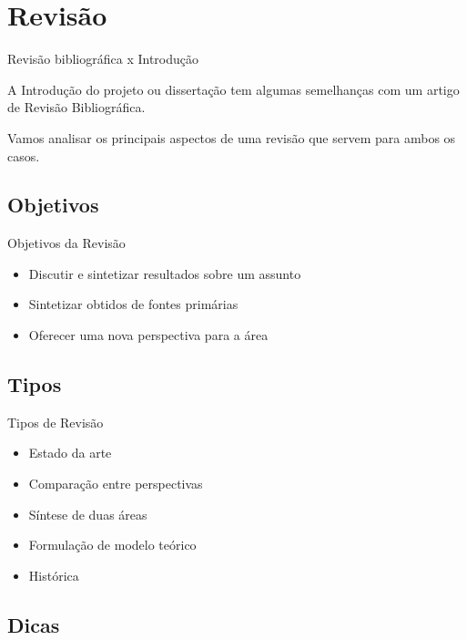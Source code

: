 \documentclass{beamer}
\begin{document}
\section{Revisão}

\begin{frame}{Revisão bibliográfica x Introdução}
  \begin{block}{}
    A Introdução do projeto ou dissertação tem algumas semelhanças com
    um artigo de Revisão Bibliográfica.

    \bigskip

    Vamos analisar os principais aspectos de uma revisão que servem
    para ambos os casos.
  \end{block}
\end{frame}

\subsection{Objetivos}

\begin{frame}{Objetivos da Revisão}
  \begin{itemize}
  \item Discutir e sintetizar resultados sobre um assunto
  \item Sintetizar obtidos de fontes primárias
  \item Oferecer uma nova perspectiva para a área
  \end{itemize}
\end{frame}

\subsection{Tipos}

\begin{frame}{Tipos de Revisão}
  \begin{itemize}
  \item Estado da arte
  \item Comparação entre perspectivas
  \item Síntese de duas áreas
  \item Formulação de modelo teórico
  \item Histórica
  \end{itemize}
\end{frame}

\subsection{Dicas}
\end{document}

